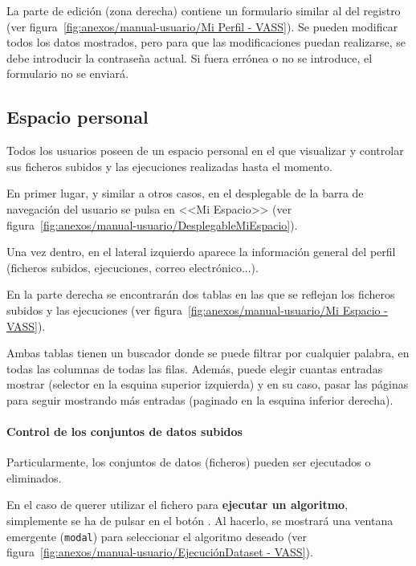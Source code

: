 La parte de edición (zona derecha) contiene un formulario similar al del
registro (ver figura~\ref{fig:anexos/manual-usuario/Mi Perfil - VASS}). Se
pueden modificar todos los datos mostrados, pero para que las modificaciones
puedan realizarse, se debe introducir la contraseña actual. Si fuera errónea o
no se introduce, el formulario no se enviará.

\label{mu:perfil}

\subsection{Espacio personal}

Todos los usuarios poseen de un espacio personal en el que visualizar y
controlar sus ficheros subidos y las ejecuciones realizadas hasta el momento.

En primer lugar, y similar a otros casos, en el desplegable de la barra de
navegación del usuario se pulsa en <<Mi Espacio>> (ver
figura~\ref{fig:anexos/manual-usuario/DesplegableMiEspacio}).


Una vez dentro, en el lateral izquierdo aparece la información general del
perfil (ficheros subidos, ejecuciones, correo electrónico...).

En la parte derecha se encontrarán dos tablas en las que se reflejan los
ficheros subidos y las ejecuciones (ver figura~\ref{fig:anexos/manual-usuario/Mi
Espacio - VASS}).


Ambas tablas tienen un buscador donde se puede filtrar por cualquier palabra, en
todas las columnas de todas las filas. Además, puede elegir cuantas entradas
mostrar (selector en la esquina superior izquierda) y en su caso, pasar las
páginas para seguir mostrando más entradas (paginado en la esquina inferior
derecha).

\paragraph{Control de los conjuntos de datos subidos} Particularmente, los
conjuntos de datos (ficheros) pueden ser ejecutados o eliminados.

En el caso de querer utilizar el fichero para \textbf{ejecutar un algoritmo},
simplemente se ha de pulsar en el botón \button[vassgold]{$\blacktriangleright$}. Al
hacerlo, se mostrará una ventana emergente (\texttt{modal}) para seleccionar el
algoritmo deseado (ver figura~\ref{fig:anexos/manual-usuario/EjecuciónDataset -
VASS}).

